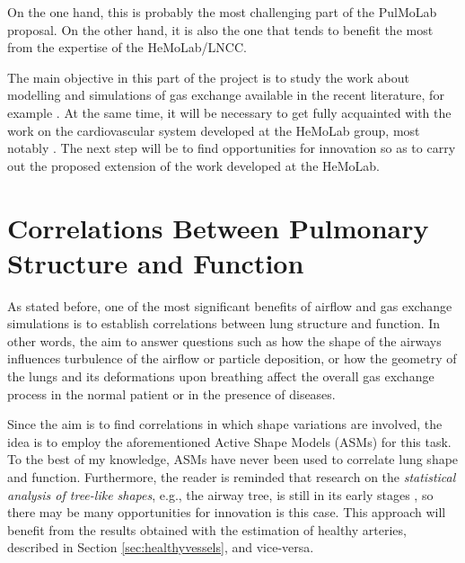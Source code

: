 On the one hand, this is probably the most challenging part of the PulMoLab proposal. On the other hand, it is also the one that tends to benefit the most from the expertise of the HeMoLab/LNCC. 

\approach

\begin{sloppypar}
The main objective in this part of the project is to study the work about modelling and simulations of gas exchange available in the recent literature, for example \citep{TawhaiM2011,Tawhai2010,Tawhai08,Burrowes2005,Lin2009,Werner2009,DeBacker2008,DeBacker2010,Gemci2007}. At the same time, it will be necessary to get fully acquainted with the work on the cardiovascular system developed at the HeMoLab group, most notably \citep{Blanco2007,Blanco2009a,Blanco2010,Blanco2012,Urquiza2006}. The next step will be to find opportunities for innovation so as to carry out the proposed extension of the work developed at the HeMoLab.
\end{sloppypar}

\section{Correlations Between Pulmonary Structure and Function}

\challenge

As stated before, one of the most significant benefits of airflow and gas exchange simulations is to establish correlations between lung structure and function. In other words, the aim to answer questions such as how the shape of the airways influences turbulence of the airflow or particle deposition, or how the geometry of the lungs and its deformations upon breathing affect the overall gas exchange process in the normal patient or in the presence of diseases. 

\approach

\begin{sloppypar}
Since the aim is to find correlations in which shape variations are involved, the idea is to employ the aforementioned Active Shape Models (ASMs) \citep{Cootes} for this task. To the best of my knowledge, ASMs have never been used to correlate lung shape and function. Furthermore, the reader is reminded that research on the {\em statistical analysis of tree-like shapes}, e.g., the airway tree, is still in its early stages \citep{Feragen2011,Feragen2012}, so there may be many opportunities for innovation is this case. This approach will benefit from the results obtained with the estimation of healthy arteries, described in Section \ref{sec:healthyvessels}, and vice-versa.
\end{sloppypar}

